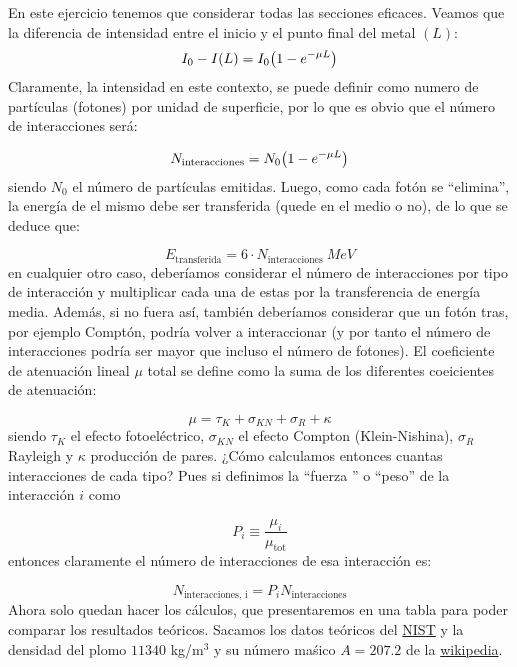 En este ejercicio tenemos que considerar todas las secciones eficaces. Veamos que la diferencia de intensidad entre el inicio y el punto final del metal $(L)$: 
\begin{equation}
   I_0 - I(L) = I_0 \pqty{1-e^{-\mu L}} 
\end{equation}
Claramente, la intensidad en este contexto, se puede definir como numero de partículas (fotones) por unidad de superficie, por lo que es obvio que el número de interacciones será: 

\begin{equation}
    N_{\text{interacciones}}= N_0 \pqty{1-e^{-\mu L}} 
\end{equation}
siendo $N_0$ el número de partículas emitidas. Luego, como cada fotón se ``elimina'', la energía de el mismo debe ser transferida (quede en el medio o no), de lo que se deduce que: 

\begin{equation}
    E_{\text{transferida}} = 6 \cdot N_{\text{interacciones}}  \ \unit{MeV}
\end{equation}
en cualquier otro caso, deberíamos considerar el número de interacciones por tipo de interacción y multiplicar cada una de estas por la transferencia de energía media. Además, si no fuera así, también deberíamos considerar que un fotón tras, por ejemplo Comptón, podría volver a interaccionar (y por tanto el número de interacciones podría ser mayor que incluso el número de fotones). El coeficiente de atenuación lineal $\mu$ total se define como la suma de los diferentes coeicientes de atenuación: 

\begin{equation}
    \mu = \tau_K + \sigma_{KN} + \sigma_R + \kappa 
\end{equation}
siendo $\tau_K$ el efecto fotoeléctrico, $\sigma_{KN}$ el efecto Compton (Klein-Nishina), $\sigma_R$ Rayleigh y $\kappa$ producción de pares. ¿Cómo calculamos entonces cuantas interacciones de cada tipo? Pues si definimos la ``fuerza '' o ``peso'' de la interacción $i$ como 

\begin{equation}
    P_i \equiv \frac{\mu_i}{\mu_{\text{tot}}}
\end{equation}
entonces claramente el número de interacciones de esa interacción es: 

\begin{equation}
    N_{\text{interacciones, i}} =  P_i N_{\text{interacciones}}
\end{equation}
Ahora solo quedan hacer los cálculos, que presentaremos en una tabla para poder comparar los resultados teóricos. Sacamos los datos teóricos del \href{https://physics.nist.gov/PhysRefData/Xcom/html/xcom1.html}{NIST} y la densidad del plomo $11340$ kg/m$^3$ y su número maśico $A=207.2$ de la \href{https://es.wikipedia.org/wiki/Plomo}{wikipedia}.

